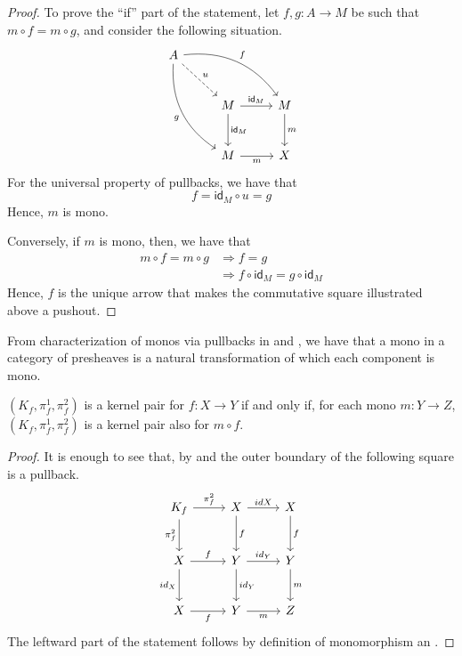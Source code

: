 \documentclass[runningheads,envcountsect]{llncs}
\newcommand{\id}[1]{\mathsf{id}_{#1}}
\begin{document}
\begin{proof}
    To prove the ``if'' part of the statement, let $f, g: A \to M$ be such that $m\circ f = m\circ g$, and consider the following situation.
    \[
        \begin{tikzcd}[row sep=26, column sep = 26]
        A \arrow[drr, bend left=30, "f"] \arrow[ddr, bend right=30,"g" swap] \arrow[dr, dashed, "u"] & & \\
        & M  \arrow[d, "{\id{M}}"] \arrow[r, "{\id{M}}"] & M \arrow[d, "m"] \\
        & M  \arrow[r, "m" swap] & X
        \end{tikzcd}
    \]
    For the universal property of pullbacks, we have that $$f  =  \id{M} \circ u =  g$$
    Hence, $m$ is mono.

    Conversely, if $m$ is mono, then, we have that
    \begin{align*}
        m \circ f = m \circ g   &\Rightarrow    f = g \\
                                &\Rightarrow    f \circ \id{M} = g\circ \id{M}
    \end{align*}
    Hence, $f$ is the unique arrow that makes the commutative square illustrated above a pushout.
\end{proof}

\begin{remark}\label{rem:monos_in_presh_cats}
    From characterization of monos via pullbacks in  and , we have that a mono in a category of presheaves is a natural transformation of which each component is mono.
\end{remark}

\begin{corollary}\label{cor:kermono}
	$(K_f, \pi_f^1, \pi_f^2)$ is a kernel pair for $f\colon X\to Y$ if and only if, for each mono $m\colon Y\to Z$, $(K_f, \pi_f^1, \pi_f^2)$ is a kernel pair also for $m\circ f$.
\end{corollary}
\begin{proof}
    It is enough to see that, by  and  the outer boundary of the following square is a pullback.
        \[\begin{tikzcd}[row sep=13 pt, column sep=13 pt]
    	{K_f} && X && X \\
    	\\
    	X && Y && Y \\
    	\\
    	X && Y && Z
    	\arrow["{\pi_f^2}", from=1-1, to=1-3]
    	\arrow["{\pi_f^2}"', from=1-1, to=3-1]
    	\arrow["{id{X}}", from=1-3, to=1-5]
    	\arrow["f", from=1-3, to=3-3]
    	\arrow["f", from=1-5, to=3-5]
    	\arrow["f", from=3-1, to=3-3]
    	\arrow["{id_X}"', from=3-1, to=5-1]
    	\arrow["{id_Y}", from=3-3, to=3-5]
    	\arrow["{id_Y}", from=3-3, to=5-3]
    	\arrow["m", from=3-5, to=5-5]
    	\arrow["f"', from=5-1, to=5-3]
    	\arrow["m"', from=5-3, to=5-5]
    \end{tikzcd}\]
    The leftward part of the statement follows by definition of monomorphism an .
\end{proof}
\end{document}
